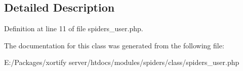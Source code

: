 \subsection{Detailed Description}


Definition at line 11 of file spiders\-\_\-user.\-php.



The documentation for this class was generated from the following file\-:\begin{DoxyCompactItemize}
\item 
E\-:/\-Packages/xortify server/htdocs/modules/spiders/class/spiders\-\_\-user.\-php\end{DoxyCompactItemize}
